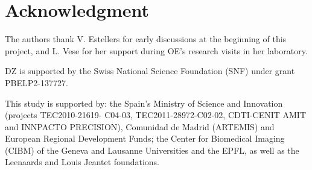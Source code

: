 \section*{Acknowledgment}
The authors thank V. Estellers for early discussions at the beginning of this project,
  and L. Vese for her support during OE's research visits in her laboratory.

DZ is supported by the Swiss National Science Foundation (SNF) under grant PBELP2-137727.

This study is supported by: the Spain's Ministry of Science and Innovation
(projects TEC2010-21619- C04-03, TEC2011-28972-C02-02, CDTI-CENIT
AMIT and INNPACTO PRECISION), Comunidad de Madrid (ARTEMIS) and
European Regional Development Funds; the Center for Biomedical Imaging
(CIBM) of the Geneva and Lausanne Universities and the EPFL, as well as the
Leenaards and Louis Jeantet foundations.
